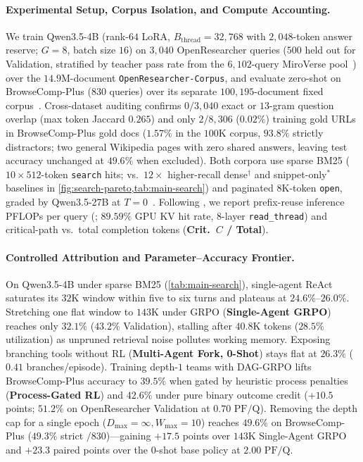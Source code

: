 \documentclass{article}
\begin{document}
\begin{table}[!t]
\end{table}

\paragraph{Experimental Setup, Corpus Isolation, and Compute Accounting.}
We train Qwen3.5-4B (rank-$64$ LoRA, $B_{\text{thread}} = 32{,}768$ with $2{,}048$-token answer reserve; $G=8$, batch size $16$) on $3{,}040$ OpenResearcher queries ($500$ held out for Validation, stratified by teacher pass rate from the $6{,}102$-query MiroVerse pool~\citep{li2026openresearcher}) over the $14.9\text{M}$-document \texttt{OpenResearcher-Corpus}, and evaluate zero-shot on BrowseComp-Plus ($830$ queries) over its separate $100{,}195$-document fixed corpus~\citep{chen2025browsecompplus}. Cross-dataset auditing confirms $0/3{,}040$ exact or $13$-gram question overlap (max token Jaccard $0.265$) and only $2/8{,}306$ ($0.02\%$) training gold URLs in BrowseComp-Plus gold docs ($1.57\%$ in the $100\text{K}$ corpus, $93.8\%$ strictly distractors; two general Wikipedia pages with zero shared answers, leaving test accuracy unchanged at $49.6\%$ when excluded). Both corpora use sparse BM25 ($10 \times 512$-token \texttt{search} hits; vs.\ $12\times$ higher-recall dense$^\dagger$ and snippet-only$^*$ baselines in \cref{fig:search-pareto,tab:main-search}) and paginated $8\text{K}$-token \texttt{open}, graded by Qwen3.5-27B at $T=0$~\citep{shao2026clm}. Following \citet{shao2026clm}, we report prefix-reuse inference PFLOPs per query (; $89.59\%$ GPU KV hit rate, $8$-layer \texttt{read\_thread}) and critical-path vs.\ total completion tokens (\textbf{Crit.\ $C$ / Total}).

\paragraph{Controlled Attribution and Parameter--Accuracy Frontier.}
On Qwen3.5-4B under sparse BM25 (\cref{tab:main-search}), single-agent ReAct saturates its $32\text{K}$ window within five to six turns and plateaus at $24.6\%$--$26.0\%$. Stretching one flat window to $143\text{K}$ under GRPO (\textbf{Single-Agent GRPO}) reaches only $32.1\%$ ($43.2\%$ Validation), stalling after $40.8\text{K}$ tokens ($28.5\%$ utilization) as unpruned retrieval noise pollutes working memory. Exposing branching tools without RL (\textbf{Multi-Agent Fork, 0-Shot}) stays flat at $26.3\%$ ($0.41$ branches/episode). Training depth-$1$ teams with DAG-GRPO lifts BrowseComp-Plus accuracy to $39.5\%$ when gated by heuristic process penalties (\textbf{Process-Gated RL}) and $42.6\%$ under pure binary outcome credit ($+10.5$ points; $\mathbf{51.2\%}$ on OpenResearcher Validation at $0.70\text{ PF/Q}$). Removing the depth cap for a single epoch ($D_{\max}=\infty, W_{\max}=10$) reaches $\mathbf{49.6\%}$ on BrowseComp-Plus ($49.3\%$ strict $/830$)---gaining $\mathbf{+17.5}$ points over $143\text{K}$ Single-Agent GRPO and $\mathbf{+23.3}$ paired points over the 0-shot base policy at $2.00\text{ PF/Q}$.
\end{document}
